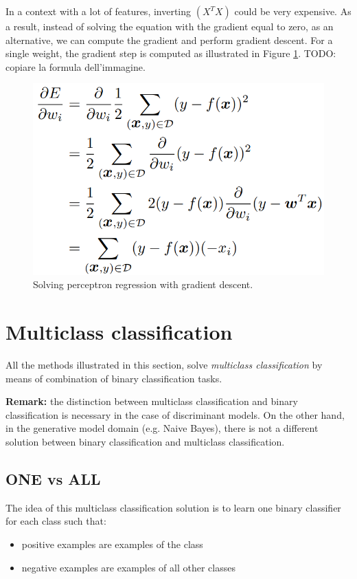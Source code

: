 In a context with a lot of features, inverting $(X^T X)$ could be very expensive. As a result, instead of solving the equation with the gradient equal to zero, as an alternative, we can compute the gradient and perform gradient descent. For a single weight, the gradient step is computed as illustrated in Figure \ref{fig:perceptronRegressionGradientDescent}. TODO: copiare la formula dell'immagine.

\begin{figure}
    \centering
    \includegraphics[scale=0.4]{images/perceptronRegressionGradientDescent.png}
    \caption{Solving perceptron regression with gradient descent.}
    \label{fig:perceptronRegressionGradientDescent}
\end{figure}

\section{Multiclass classification}
All the methods illustrated in this section, solve \textit{multiclass classification} by means of combination of binary classification tasks. \newline

\textbf{Remark:} the distinction between multiclass classification and binary classification is necessary in the case of discriminant models. On the other hand, in the generative model domain (e.g. Naive Bayes), there is not a different solution between binary classification and multiclass classification.

\subsection{ONE vs ALL}
The idea of this multiclass classification solution is to learn one binary classifier for each class such that:
\begin{itemize}
    \item positive examples are examples of the class
    \item negative examples are examples of all other classes
\end{itemize}

